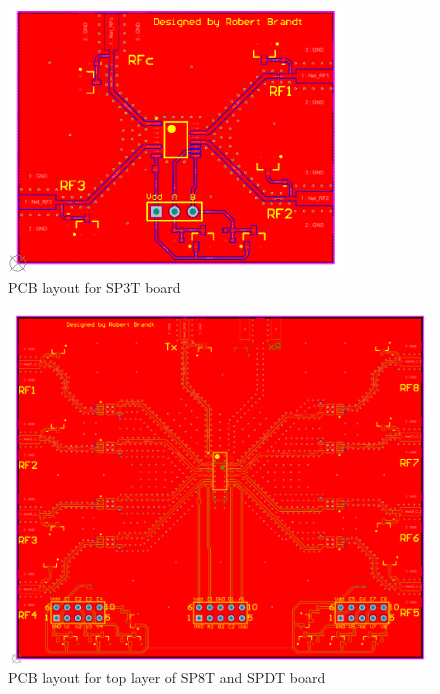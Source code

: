  
\begin{figure}[h]
	\begin{center}
		\includegraphics[width=3.5in]{./images/sp3t.png}
		\caption{PCB layout for SP3T board}
		\label{fig:sp3t}
	\end{center}
\end{figure}

\begin{figure}[h]
	\begin{center}
		\includegraphics[width=5.5in]{./images/sp8t_top.png}
		\caption{PCB layout for top layer of SP8T and SPDT board}
		\label{fig:sp8t_top}
	\end{center}
\end{figure}

